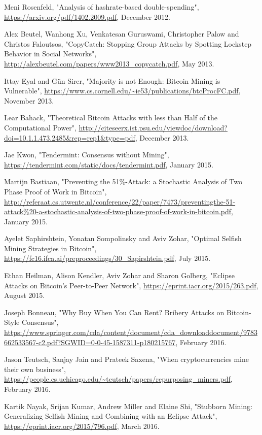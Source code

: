 \documentclass[12pt,a4paper]{article}
\begin{document}
\begin{thebibliography}{9}
Meni Rosenfeld,
"Analysis of hashrate-based double-spending",
\url{https://arxiv.org/pdf/1402.2009.pdf},
December 2012.

Alex Beutel, Wanhong Xu, Venkatesan Guruswami, Christopher Palow and Christos Faloutsos,
"CopyCatch: Stopping Group Attacks by Spotting Lockstep Behavior in Social Networks",
\url{http://alexbeutel.com/papers/www2013_copycatch.pdf},
May 2013.

Ittay Eyal and Gün Sirer,
"Majority is not Enough: Bitcoin Mining is Vulnerable",
\url{https://www.cs.cornell.edu/~ie53/publications/btcProcFC.pdf},
November 2013.

Lear Bahack,
"Theoretical Bitcoin Attacks with less than Half of the Computational Power",
\url{http://citeseerx.ist.psu.edu/viewdoc/download?doi=10.1.1.473.2485&rep=rep1&type=pdf},
December 2013.

Jae Kwon,
"Tendermint: Consensus without Mining",
\url{https://tendermint.com/static/docs/tendermint.pdf},
January 2015.

Martijn Bastiaan,
"Preventing the 51\%-Attack: a Stochastic Analysis of Two Phase Proof of Work in Bitcoin",
\url{http://referaat.cs.utwente.nl/conference/22/paper/7473/preventingthe-51-attack%20-a-stochastic-analysis-of-two-phase-proof-of-work-in-bitcoin.pdf},
January 2015.

Ayelet Saphirshtein, Yonatan Sompolinsky and Aviv Zohar,
"Optimal Selfish Mining Strategies in Bitcoin",
\url{https://fc16.ifca.ai/preproceedings/30_Sapirshtein.pdf},
July 2015.

Ethan Heilman, Alison Kendler, Aviv Zohar and Sharon Golberg,
"Eclipse Attacks on Bitcoin’s Peer-to-Peer Network",
\url{https://eprint.iacr.org/2015/263.pdf},
August 2015.

Joseph Bonneau,
"Why Buy When You Can Rent? Bribery Attacks on Bitcoin-Style Consensus",
\url{https://www.springer.com/cda/content/document/cda_downloaddocument/9783662533567-c2.pdf?SGWID=0-0-45-1587311-p180215767},
February 2016.

Jason Teutsch, Sanjay Jain and Prateek Saxena,
"When cryptocurrencies mine their own business",
\url{https://people.cs.uchicago.edu/~teutsch/papers/repurposing_miners.pdf},
February 2016.

Kartik Nayak, Srijan Kumar, Andrew Miller and Elaine Shi,
"Stubborn Mining: Generalizing Selfish Mining and Combining with an Eclipse Attack",
\url{https://eprint.iacr.org/2015/796.pdf},
March 2016.


\end{thebibliography}
\end{document}

